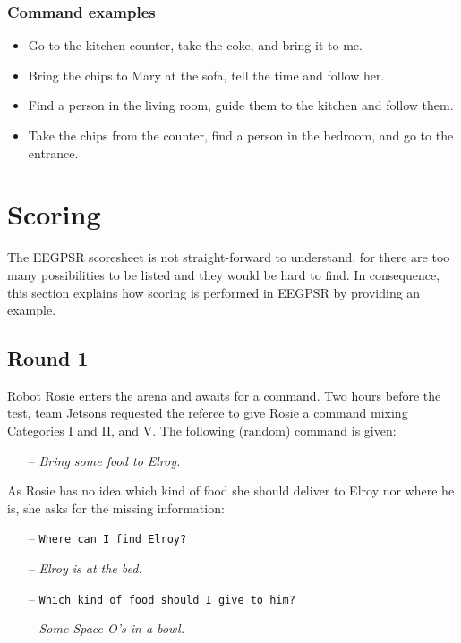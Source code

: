 \subsubsection{Command examples}
\begin{itemize}
	\item Go to the kitchen counter, take the coke, and bring it to me.
	\item Bring the chips to Mary at the sofa, tell the time and follow her.
	\item Find a person in the living room, guide them to the kitchen and follow them.
	\item Take the chips from the counter, find a person in the bedroom, and go to the entrance.
\end{itemize}



\section{Scoring}
The EEGPSR scoresheet is not straight-forward to understand, for there are too many possibilities to be listed and they would be hard to find. In consequence, this section explains how scoring is performed in EEGPSR by providing an example.

\subsection{Round 1}
Robot Rosie enters the arena and awaits for a command. Two hours before the test, team Jetsons requested the referee to give Rosie a command mixing Categories I and II, and V. The following (random) command is given:

\begin{itemize}
	\item[--] \textit{Bring some food to Elroy.}
\end{itemize}

As Rosie has no idea which kind of food she should deliver to Elroy nor where he is, she asks for the missing information:

\begin{itemize}
	\item[--] \texttt{Where can I find Elroy?}
	\item[--] \textit{Elroy is at the bed.}
	\item[--] \texttt{Which kind of food should I give to him?}
	\item[--] \textit{Some Space O's in a bowl.}
\end{itemize}

